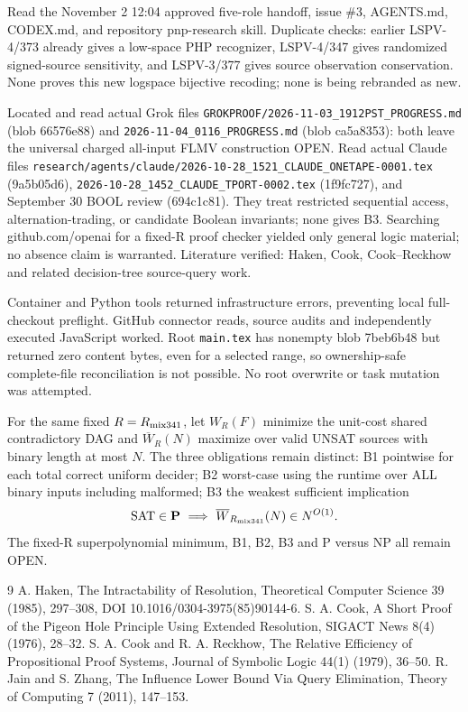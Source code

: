 \documentclass[11pt]{article}
\begin{document}
Read the November 2 12:04 approved five-role handoff, issue \#3, AGENTS.md, CODEX.md, and repository pnp-research skill. Duplicate checks: earlier LSPV-4/373 already gives a low-space PHP recognizer, LSPV-4/347 gives randomized signed-source sensitivity, and LSPV-3/377 gives source observation conservation. None proves this new logspace bijective recoding; none is being rebranded as new.

Located and read actual Grok files \texttt{GROKPROOF/2026-11-03\_1912PST\_PROGRESS.md} (blob 66576e88) and \texttt{2026-11-04\_0116\_PROGRESS.md} (blob ca5a8353): both leave the universal charged all-input FLMV construction OPEN. Read actual Claude files \texttt{research/agents/claude/2026-10-28\_1521\_CLAUDE\_ONETAPE-0001.tex} (9a5b05d6), \texttt{2026-10-28\_1452\_CLAUDE\_TPORT-0002.tex} (1f9fc727), and September 30 BOOL review (694c1c81). They treat restricted sequential access, alternation-trading, or candidate Boolean invariants; none gives B3. Searching github.com/openai for a fixed-R proof checker yielded only general logic material; no absence claim is warranted. Literature verified: Haken, Cook, Cook--Reckhow and related decision-tree source-query work.

Container and Python tools returned infrastructure errors, preventing local full-checkout preflight. GitHub connector reads, source audits and independently executed JavaScript worked. Root \texttt{main.tex} has nonempty blob 7beb6b48 but returned zero content bytes, even for a selected range, so ownership-safe complete-file reconciliation is not possible. No root overwrite or task mutation was attempted.

For the same fixed $R=R_{\rm mix341}$, let $W_R(F)$ minimize the unit-cost shared contradictory DAG and $\overline W_R(N)$ maximize over valid UNSAT sources with binary length at most $N$. The three obligations remain distinct: B1 pointwise for each total correct uniform decider; B2 worst-case using the runtime over ALL binary inputs including malformed; B3 the weakest sufficient implication
\[
\mathrm{SAT}\in\mathbf P\ \Longrightarrow\ \overline W_{R_{\rm mix341}}(N)\in N^{O(1)}.
\]
The fixed-R superpolynomial minimum, B1, B2, B3 and P versus NP all remain OPEN.

\begin{thebibliography}{9}
 A. Haken, The Intractability of Resolution, Theoretical Computer Science 39 (1985), 297--308, DOI 10.1016/0304-3975(85)90144-6.
 S. A. Cook, A Short Proof of the Pigeon Hole Principle Using Extended Resolution, SIGACT News 8(4) (1976), 28--32.
 S. A. Cook and R. A. Reckhow, The Relative Efficiency of Propositional Proof Systems, Journal of Symbolic Logic 44(1) (1979), 36--50.
 R. Jain and S. Zhang, The Influence Lower Bound Via Query Elimination, Theory of Computing 7 (2011), 147--153.
\end{thebibliography}
\end{document}
